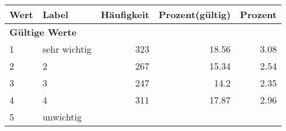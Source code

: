      \begin{longtable}{lXrrr}
     \toprule
     \textbf{Wert} & \textbf{Label} & \textbf{Häufigkeit} & \textbf{Prozent(gültig)} & \textbf{Prozent} \\
     \endhead
     \midrule
     \multicolumn{5}{l}{\textbf{Gültige Werte}}\\

     1 &
     \multicolumn{1}{X}{ sehr wichtig   } &


       \num{323} &
       \num[round-mode=places,round-precision=2]{18,56} &
         \num[round-mode=places,round-precision=2]{3,08} \\

     2 &
     \multicolumn{1}{X}{ 2   } &


       \num{267} &
       \num[round-mode=places,round-precision=2]{15,34} &
         \num[round-mode=places,round-precision=2]{2,54} \\

     3 &
     \multicolumn{1}{X}{ 3   } &


       \num{247} &
       \num[round-mode=places,round-precision=2]{14,2} &
         \num[round-mode=places,round-precision=2]{2,35} \\

     4 &
     \multicolumn{1}{X}{ 4   } &


       \num{311} &
       \num[round-mode=places,round-precision=2]{17,87} &
         \num[round-mode=places,round-precision=2]{2,96} \\

     5 &
     \multicolumn{1}{X}{ unwichtig   } &



\end{longtable}
